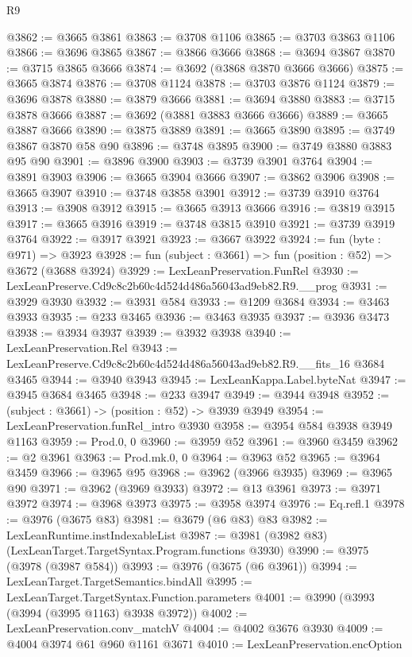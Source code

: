 \begin{lexlean}{R9}
\begin{coremodule}
@3862 := @3665 @3861
@3863 := @3708 @1106
@3865 := @3703 @3863 @1106
@3866 := @3696 @3865
@3867 := @3866 @3666
@3868 := @3694 @3867
@3870 := @3715 @3865 @3666
@3874 := @3692 (@3868 @3870 @3666 @3666)
@3875 := @3665 @3874
@3876 := @3708 @1124
@3878 := @3703 @3876 @1124
@3879 := @3696 @3878
@3880 := @3879 @3666
@3881 := @3694 @3880
@3883 := @3715 @3878 @3666
@3887 := @3692 (@3881 @3883 @3666 @3666)
@3889 := @3665 @3887 @3666
@3890 := @3875 @3889
@3891 := @3665 @3890
@3895 := @3749 @3867 @3870 @58 @90
@3896 := @3748 @3895
@3900 := @3749 @3880 @3883 @95 @90
@3901 := @3896 @3900
@3903 := @3739 @3901 @3764
@3904 := @3891 @3903
@3906 := @3665 @3904 @3666
@3907 := @3862 @3906
@3908 := @3665 @3907
@3910 := @3748 @3858 @3901
@3912 := @3739 @3910 @3764
@3913 := @3908 @3912
@3915 := @3665 @3913 @3666
@3916 := @3819 @3915
@3917 := @3665 @3916
@3919 := @3748 @3815 @3910
@3921 := @3739 @3919 @3764
@3922 := @3917 @3921
@3923 := @3667 @3922
@3924 := fun (byte : @971) => @3923
@3928 := fun (subject : @3661) => fun (position : @52) => @3672 (@3688 @3924)
@3929 := LexLeanPreservation.FunRel
@3930 := LexLeanPreserve.Cd9c8c2b60c4d524d486a56043ad9eb82.R9.__prog
@3931 := @3929 @3930
@3932 := @3931 @584
@3933 := @1209 @3684
@3934 := @3463 @3933
@3935 := @233 @3465
@3936 := @3463 @3935
@3937 := @3936 @3473
@3938 := @3934 @3937
@3939 := @3932 @3938
@3940 := LexLeanPreservation.Rel
@3943 := LexLeanPreserve.Cd9c8c2b60c4d524d486a56043ad9eb82.R9.__fits_16 @3684 @3465
@3944 := @3940 @3943
@3945 := LexLeanKappa.Label.byteNat
@3947 := @3945 @3684 @3465
@3948 := @233 @3947
@3949 := @3944 @3948
@3952 := (subject : @3661) -> (position : @52) -> @3939 @3949
@3954 := LexLeanPreservation.funRel_intro @3930
@3958 := @3954 @584 @3938 @3949 @1163
@3959 := Prod.{0, 0}
@3960 := @3959 @52
@3961 := @3960 @3459
@3962 := @2 @3961
@3963 := Prod.mk.{0, 0}
@3964 := @3963 @52
@3965 := @3964 @3459
@3966 := @3965 @95
@3968 := @3962 (@3966 @3935)
@3969 := @3965 @90
@3971 := @3962 (@3969 @3933)
@3972 := @13 @3961
@3973 := @3971 @3972
@3974 := @3968 @3973
@3975 := @3958 @3974
@3976 := Eq.refl.{1}
@3978 := @3976 (@3675 @83)
@3981 := @3679 (@6 @83) @83
@3982 := LexLeanRuntime.instIndexableList
@3987 := @3981 (@3982 @83) (LexLeanTarget.TargetSyntax.Program.functions @3930)
@3990 := @3975 (@3978 (@3987 @584))
@3993 := @3976 (@3675 (@6 @3961))
@3994 := LexLeanTarget.TargetSemantics.bindAll
@3995 := LexLeanTarget.TargetSyntax.Function.parameters
@4001 := @3990 (@3993 (@3994 (@3995 @1163) @3938 @3972))
@4002 := LexLeanPreservation.conv_matchV
@4004 := @4002 @3676 @3930
@4009 := @4004 @3974 @61 @960 @1161 @3671
@4010 := LexLeanPreservation.encOption

\end{coremodule}
\end{lexlean}
